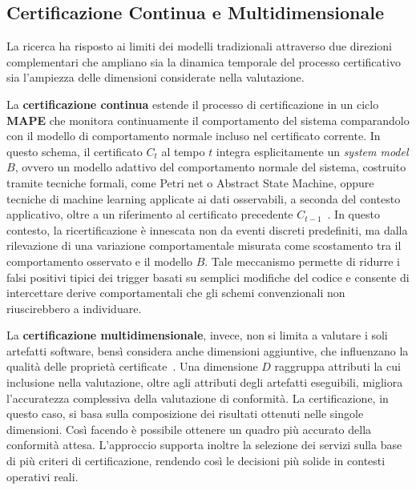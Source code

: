 \subsection{Certificazione Continua e Multidimensionale}
\label{subsec:cert_avanzata}

La ricerca ha risposto ai limiti dei modelli tradizionali attraverso due direzioni complementari
che ampliano sia la dinamica temporale del processo certificativo sia l'ampiezza delle
dimensioni considerate nella valutazione.

La \textbf{certificazione continua} estende il processo di certificazione in un ciclo
\textbf{\gls{MAPE}} che monitora continuamente il comportamento del sistema comparandolo con
il modello di comportamento normale incluso nel certificato corrente. In questo schema, il
certificato $C_t$ al tempo $t$ integra esplicitamente un \emph{system model} $B$, ovvero un
modello adattivo del comportamento normale del sistema, costruito tramite tecniche formali, 
come Petri net o Abstract State Machine, oppure tecniche di machine learning applicate ai dati osservabili, a
seconda del contesto applicativo, oltre a un riferimento al certificato precedente
$C_{t-1}$~\cite{anisetti2023continuous}. In questo contesto, la ricertificazione è innescata
non da eventi discreti predefiniti, ma dalla rilevazione di una variazione comportamentale
misurata come scostamento tra il comportamento osservato e il modello $B$. Tale meccanismo
permette di ridurre i falsi positivi tipici dei trigger basati su semplici modifiche del codice
e consente di intercettare derive comportamentali che gli schemi convenzionali non riuscirebbero
a individuare.

La \textbf{certificazione multidimensionale}, invece, non si limita a valutare i soli artefatti software, 
bensì considera anche dimensioni aggiuntive, che influenzano la qualità delle proprietà certificate~\cite{anisetti2023multidim}. 
Una dimensione $D$ raggruppa attributi la cui inclusione nella valutazione, oltre agli attributi 
degli artefatti eseguibili, migliora l'accuratezza complessiva della valutazione di conformità. La certificazione, 
in questo caso, si basa sulla composizione dei risultati ottenuti nelle singole dimensioni. 
Così facendo è possibile ottenere un quadro più accurato della conformità attesa. 
L'approccio supporta inoltre la selezione dei servizi sulla base di più criteri di certificazione, 
rendendo così le decisioni più solide in contesti operativi reali.

